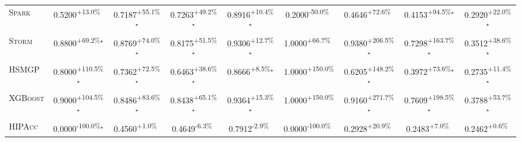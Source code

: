 \begin{table}[htbp]
\begin{tabular}{l|cccc|cccc}
\textsc{Spark} & \cellcolor{green!30}0.5200\textsuperscript{+13.0\%}$^{\,\,\,}$ & \cellcolor{green!30}0.7187\textsuperscript{+55.1\%}$^\star$ & \cellcolor{green!30}0.7263\textsuperscript{+49.2\%}$^\star$ & \cellcolor{green!30}0.8916\textsuperscript{+10.4\%}$^\star$ & \cellcolor{red!30}0.2000\textsuperscript{-50.0\%}$^{\,\,\,}$ & \cellcolor{green!30}0.4646\textsuperscript{+72.6\%}$^{\,\,\,}$ & \cellcolor{green!30}0.4153\textsuperscript{+94.5\%}$^\star$ & \cellcolor{green!30}0.2920\textsuperscript{+22.0\%}$^\star$ \\
\textsc{Storm} & \cellcolor{green!30}0.8800\textsuperscript{+69.2\%}$^\star$ & \cellcolor{green!30}0.8769\textsuperscript{+74.0\%}$^\star$ & \cellcolor{green!30}0.8175\textsuperscript{+51.5\%}$^\star$ & \cellcolor{green!30}0.9306\textsuperscript{+12.7\%}$^\star$ & \cellcolor{green!30}1.0000\textsuperscript{+66.7\%}$^{\,\,\,}$ & \cellcolor{green!30}0.9380\textsuperscript{+206.5\%}$^\star$ & \cellcolor{green!30}0.7298\textsuperscript{+163.7\%}$^\star$ & \cellcolor{green!30}0.3512\textsuperscript{+38.6\%}$^\star$ \\
\textsc{HSMGP} & \cellcolor{green!30}0.8000\textsuperscript{+110.5\%}$^\star$ & \cellcolor{green!30}0.7362\textsuperscript{+72.5\%}$^\star$ & \cellcolor{green!30}0.6463\textsuperscript{+38.6\%}$^\star$ & \cellcolor{green!30}0.8666\textsuperscript{+8.5\%}$^\star$ & \cellcolor{green!30}1.0000\textsuperscript{+150.0\%}$^{\,\,\,}$ & \cellcolor{green!30}0.6205\textsuperscript{+148.2\%}$^\star$ & \cellcolor{green!30}0.3972\textsuperscript{+73.6\%}$^\star$ & \cellcolor{green!30}0.2735\textsuperscript{+11.4\%}$^\star$ \\
\textsc{XGBoost} & \cellcolor{green!30}0.9000\textsuperscript{+104.5\%}$^\star$ & \cellcolor{green!30}0.8486\textsuperscript{+83.6\%}$^\star$ & \cellcolor{green!30}0.8438\textsuperscript{+65.1\%}$^\star$ & \cellcolor{green!30}0.9364\textsuperscript{+15.3\%}$^\star$ & \cellcolor{green!30}1.0000\textsuperscript{+150.0\%}$^{\,\,\,}$ & \cellcolor{green!30}0.9160\textsuperscript{+271.7\%}$^\star$ & \cellcolor{green!30}0.7609\textsuperscript{+198.5\%}$^\star$ & \cellcolor{green!30}0.3788\textsuperscript{+53.7\%}$^\star$ \\
\textsc{HIPAcc} & \cellcolor{red!30}0.0000\textsuperscript{-100.0\%}$^\star$ & \cellcolor{green!30}0.4560\textsuperscript{+1.0\%}$^{\,\,\,}$ & \cellcolor{red!30}0.4649\textsuperscript{-6.3\%}$^{\,\,\,}$ & \cellcolor{red!30}0.7912\textsuperscript{-2.9\%}$^{\,\,\,}$ & \cellcolor{red!30}0.0000\textsuperscript{-100.0\%}$^{\,\,\,}$ & \cellcolor{green!30}0.2928\textsuperscript{+20.9\%}$^{\,\,\,}$ & \cellcolor{green!30}0.2483\textsuperscript{+7.0\%}$^{\,\,\,}$ & \cellcolor{green!30}0.2462\textsuperscript{+0.6\%}$^{\,\,\,}$ \\

\end{tabular}
\end{table}
